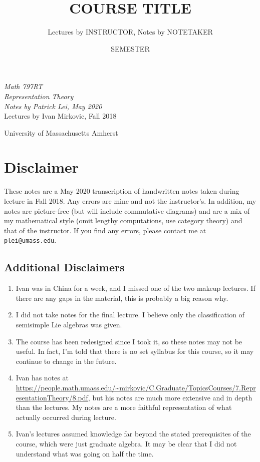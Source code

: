 \documentclass[leqno, openany]{memoir}
\title{COURSE TITLE}
\author{Lectures by INSTRUCTOR, Notes by NOTETAKER}
\date{SEMESTER}
\theoremstyle{definition}
\theoremstyle{remark}
\theoremstyle{plain}
\theoremstyle{definition}
\theoremstyle{remark}
\newcommand*{\titleSW}
    {\begingroup%
    \raggedleft
    \vspace*{\baselineskip}
    {\Huge\itshape Math 797RT \\ Representation Theory}\\[\baselineskip]
    {\large\itshape Notes by Patrick Lei,
                    May 2020}\\[0.2\textheight]
    {\Large Lectures by Ivan Mirkovic, Fall 2018}\par
    \vfill
    {\Large \sffamily University of Massachusetts Amherst}
    \vspace*{\baselineskip}
\endgroup}
\begin{document}
    
\begin{titlingpage}
\titleSW
\end{titlingpage}

\thispagestyle{empty}
\section*{Disclaimer}%
\label{sec:disclaimer}

These notes are a May 2020 transcription of handwritten notes taken during
lecture in Fall 2018.  Any errors are mine and not the instructor's.  In
addition, my notes are picture-free (but will include commutative diagrams) and
are a mix of my mathematical style (omit lengthy computations, use category
theory) and that of the instructor.  If you find any errors, please contact me
at \texttt{plei@umass.edu}.

\subsection*{Additional Disclaimers}%

\begin{enumerate} \item Ivan was in China for a week, and I missed one of the
    two makeup lectures. If there are any gaps in the material, this is
    probably a big reason why.  \item I did not take notes for the final
    lecture. I believe only the classification of semisimple Lie algebras was
    given.  \item The course has been redesigned since I took it, so these
    notes may not be useful. In fact, I'm told that there is no set syllabus
    for this course, so it may continue to change in the future.  \item Ivan
    has notes at
    \url{https://people.math.umass.edu/~mirkovic/C.Graduate/TopicsCourses/7.RepresentationTheory/8.pdf},
    but his notes are much more extensive and in depth than the lectures. My
    notes are a more faithful representation of what actually occurred during
    lecture.  \item Ivan's lectures assumed knowledge far beyond the stated
    prerequisites of the course, which were just graduate algebra. It may be
    clear that I did not understand what was going on half the time.
    \end{enumerate} \newpage



\tableofcontents
\end{document}
